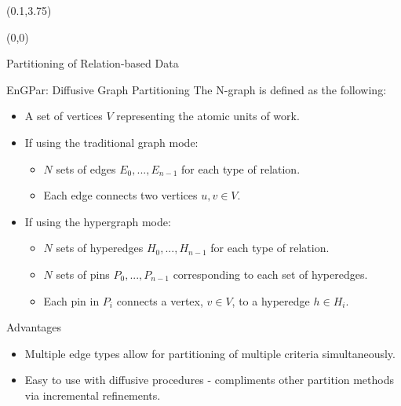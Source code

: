 \documentclass{beamer}
\begin{document}
\begin{textblock}{15.6}(0.1,3.75)
  \begin{textblock}{5}(0,0)
    \begin{block}{Partitioning of Relation-based Data}
       
    \end{block}
    \begin{block}{EnGPar: Diffusive Graph Partitioning}
      The N-graph is defined as the following:
      \begin{itemize}
      \item A set of vertices $V$ representing the atomic units of work.
      \item If using the traditional graph mode:
        \begin{itemize}
        \item $N$ sets of edges $E_0,...,E_{n-1}$ for each type of relation.
        \item Each edge connects two vertices $u,v \in V$.
        \end{itemize}
      \item If using the hypergraph mode:
        \begin{itemize}
        \item $N$ sets of hyperedges $H_0,...,H_{n-1}$ for each type of relation.
        \item $N$ sets of pins $P_0,...,P_{n-1}$ corresponding to each set of hyperedges.
        \item Each pin in $P_i$ connects a vertex, $v \in V$, to a hyperedge $h \in H_i$.
        \end{itemize}
      \end{itemize}

      Advantages
      \begin{itemize}
      \item Multiple edge types allow for partitioning of multiple criteria simultaneously.
      \item Easy to use with diffusive procedures - compliments other partition methods via incremental refinements.
      \end{itemize}
      

\end{block}
\end{textblock}
\end{textblock}
\end{document}
